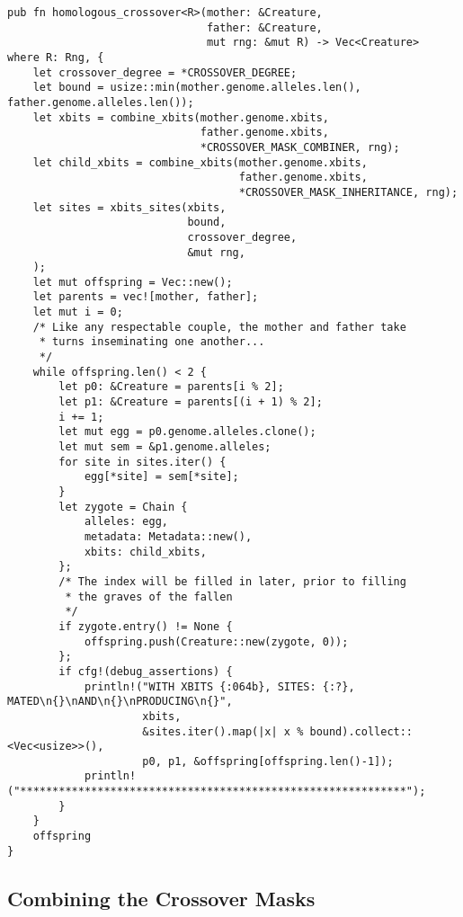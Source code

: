 \documentclass[11pt]{article}
\begin{document}
\lstset{language=rust,label=orgb372815,caption= ,captionpos=b,numbers=none}
\begin{lstlisting}
pub fn homologous_crossover<R>(mother: &Creature,
                               father: &Creature,
                               mut rng: &mut R) -> Vec<Creature>
where R: Rng, {
    let crossover_degree = *CROSSOVER_DEGREE;
    let bound = usize::min(mother.genome.alleles.len(), father.genome.alleles.len());
    let xbits = combine_xbits(mother.genome.xbits, 
                              father.genome.xbits, 
                              *CROSSOVER_MASK_COMBINER, rng);
    let child_xbits = combine_xbits(mother.genome.xbits, 
                                    father.genome.xbits, 
                                    *CROSSOVER_MASK_INHERITANCE, rng);
    let sites = xbits_sites(xbits,
                            bound, 
                            crossover_degree, 
                            &mut rng,
    );
    let mut offspring = Vec::new();
    let parents = vec![mother, father];
    let mut i = 0;
    /* Like any respectable couple, the mother and father take
     * turns inseminating one another...
     */
    while offspring.len() < 2 {
        let p0: &Creature = parents[i % 2];
        let p1: &Creature = parents[(i + 1) % 2];
        i += 1;
        let mut egg = p0.genome.alleles.clone();
        let mut sem = &p1.genome.alleles;
        for site in sites.iter() {
            egg[*site] = sem[*site];
        }
        let zygote = Chain {
            alleles: egg,
            metadata: Metadata::new(),
            xbits: child_xbits,
        };
        /* The index will be filled in later, prior to filling
         * the graves of the fallen
         */
        if zygote.entry() != None {
            offspring.push(Creature::new(zygote, 0));
        };
        if cfg!(debug_assertions) {
            println!("WITH XBITS {:064b}, SITES: {:?}, MATED\n{}\nAND\n{}\nPRODUCING\n{}",
                     xbits,
                     &sites.iter().map(|x| x % bound).collect::<Vec<usize>>(),
                     p0, p1, &offspring[offspring.len()-1]);
            println!("************************************************************");
        }
    }
    offspring
}
\end{lstlisting}

\subsection{Combining the Crossover Masks}
\label{sec:orge8bde78}
\label{org05b900e}
\end{document}
